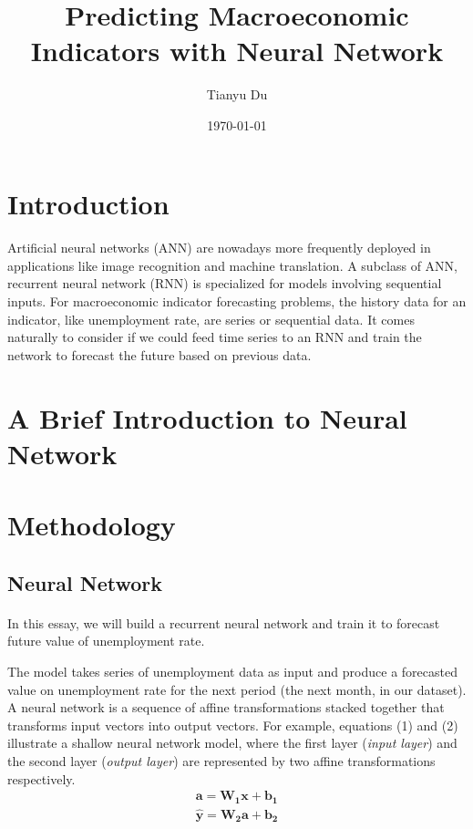 \documentclass[11pt]{article}
\author{Tianyu Du}
\date{\today}
\title{Predicting Macroeconomic Indicators with Neural Network}
\begin{document}
\maketitle
\newpage
\tableofcontents

\section{Introduction}
\paragraph{} Artificial neural networks (ANN) are nowadays more frequently deployed in applications like image recognition and machine translation. A subclass of ANN, recurrent neural network (RNN) is specialized for models involving sequential inputs. For macroeconomic indicator forecasting problems, the history data for an indicator, like unemployment rate, are series or sequential data.  It comes naturally to consider if we could feed time series to an RNN and train the network to forecast the future based on previous data.

\section{A Brief Introduction to Neural Network}

\section{Methodology}
\subsection{Neural Network}
\paragraph{}In this essay, we will build a recurrent neural network and train it to forecast future value of unemployment rate.

The model takes series of unemployment data as input and produce a forecasted value on unemployment rate for the next period (the next month, in our dataset). A neural network is a sequence of affine transformations stacked together that transforms input vectors into output vectors. For example, equations (1) and (2) illustrate a shallow neural network model, where the first layer (\emph{input layer}) and the second layer (\emph{output layer}) are represented by two affine transformations respectively.
    \begin{align}
        \pmb{a} = \pmb{W_1} \pmb{x} + \pmb{b_1} \\
        \hat{\pmb{y}} = \pmb{W_2} \pmb{a} + \pmb{b_2}
    \end{align}
    
\end{document}
